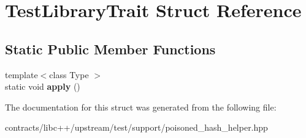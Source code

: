 \hypertarget{struct_test_library_trait}{}\section{Test\+Library\+Trait Struct Reference}
\label{struct_test_library_trait}
\subsection*{Static Public Member Functions}
\begin{DoxyCompactItemize}
\item 
\mbox{\label{struct_test_library_trait_ae447a6fd30e1e37a3bdcbb7f1b5c6241}} 
{\footnotesize template$<$class Type $>$ }\\static void {\bfseries apply} ()
\end{DoxyCompactItemize}


The documentation for this struct was generated from the following file\+:\begin{DoxyCompactItemize}
\item 
contracts/libc++/upstream/test/support/poisoned\+\_\+hash\+\_\+helper.\+hpp\end{DoxyCompactItemize}
